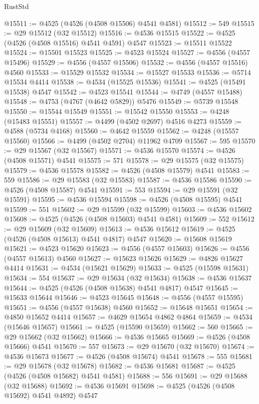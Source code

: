 \begin{lexlean}{RustStd}
\begin{coremodule}
{\begin{coremodule}
{{{{{{{{{{{{{{{{{{{{{{{{{{{{{{{{{{{{{{{{{{{{{{{{{{{{{{{@15511 := @4525 (@4526 (@4508 @15506) @4541 @4581)
@15512 := 549
@15515 := @29 @15512 (@32 @15512)
@15516 := @4536 @15515
@15522 := @4525 (@4526 (@4508 @15516) @4541 @4591) @4547
@15523 := @15511 @15522
@15524 := @15501 @15523
@15525 := @4523 @15524
@15527 := @4556 (@4557 @15496)
@15529 := @4556 (@4557 @15506)
@15532 := @4556 (@4557 @15516) @4560
@15533 := @15529 @15532
@15534 := @15527 @15533
@15536 := @5714 @15534 @4414
@15538 := @4534 (@15525 @15536)
@15541 := @4525 (@15491 @15538) @4547
@15542 := @4523 @15541
@15544 := @4749 (@4557 @15488)
@15548 := @4753 (@4767 (@4642 @5829)) @5476
@15549 := @5739 @15548
@15550 := @15544 @15549
@15551 := @15542 @15550
@15553 := @4248 (@15483 @15551)
@15557 := @4499 (@4502 @2697) @4516 @4273
@15559 := @4588 (@5734 @4168)
@15560 := @4642 @15559
@15562 := @4248 (@15557 @15560)
@15566 := @4499 (@4502 @2704) @11962 @4709
@15567 := 595
@15570 := @29 @15567 (@32 @15567)
@15571 := @4536 @15570
@15574 := @4526 (@4508 @15571) @4541
@15575 := 571
@15578 := @29 @15575 (@32 @15575)
@15579 := @4536 @15578
@15582 := @4526 (@4508 @15579) @4541
@15583 := 559
@15586 := @29 @15583 (@32 @15583)
@15587 := @4536 @15586
@15590 := @4526 (@4508 @15587) @4541
@15591 := 553
@15594 := @29 @15591 (@32 @15591)
@15595 := @4536 @15594
@15598 := @4526 (@4508 @15595) @4541
@15599 := 551
@15602 := @29 @15599 (@32 @15599)
@15603 := @4536 @15602
@15608 := @4525 (@4526 (@4508 @15603) @4541 @4581)
@15609 := 552
@15612 := @29 @15609 (@32 @15609)
@15613 := @4536 @15612
@15619 := @4525 (@4526 (@4508 @15613) @4541 @4817) @4547
@15620 := @15608 @15619
@15621 := @4523 @15620
@15623 := @4556 (@4557 @15603)
@15626 := @4556 (@4557 @15613) @4560
@15627 := @15623 @15626
@15629 := @4826 @15627 @4414
@15631 := @4534 (@15621 @15629)
@15633 := @4525 (@15598 @15631)
@15634 := 554
@15637 := @29 @15634 (@32 @15634)
@15638 := @4536 @15637
@15644 := @4525 (@4526 (@4508 @15638) @4541 @4817) @4547
@15645 := @15633 @15644
@15646 := @4523 @15645
@15648 := @4556 (@4557 @15595)
@15651 := @4556 (@4557 @15638) @4560
@15652 := @15648 @15651
@15654 := @4850 @15652 @4414
@15657 := @4629 @15654 @4862 @4864
@15659 := @4534 (@15646 @15657)
@15661 := @4525 (@15590 @15659)
@15662 := 560
@15665 := @29 @15662 (@32 @15662)
@15666 := @4536 @15665
@15669 := @4526 (@4508 @15666) @4541
@15670 := 557
@15673 := @29 @15670 (@32 @15670)
@15674 := @4536 @15673
@15677 := @4526 (@4508 @15674) @4541
@15678 := 555
@15681 := @29 @15678 (@32 @15678)
@15682 := @4536 @15681
@15687 := @4525 (@4526 (@4508 @15682) @4541 @4581)
@15688 := 556
@15691 := @29 @15688 (@32 @15688)
@15692 := @4536 @15691
@15698 := @4525 (@4526 (@4508 @15692) @4541 @4892) @4547
}}}}}}}}}}}}}}}}}}}}}}}}}}}}}}}}}}}}}}}}}}}}}}}}}}}}}}}
\end{coremodule}}
\end{coremodule}
\end{lexlean}
